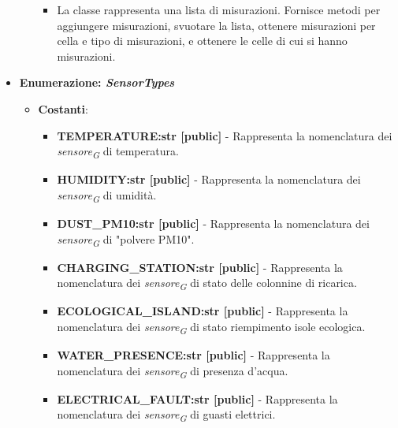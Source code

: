 \begin{itemize}
\begin{itemize}
        \begin{itemize}
            \item La classe rappresenta una lista di misurazioni. Fornisce metodi per aggiungere misurazioni, svuotare la lista, ottenere misurazioni per cella e tipo di misurazioni, e ottenere le celle di cui si hanno misurazioni.
        \end{itemize}
    \end{itemize}
    \item\textbf{Enumerazione: \textit{SensorTypes}}
        \begin{itemize}
            \item \textbf{Costanti}: 
            \begin{itemize}
                \item \textbf{TEMPERATURE:str [public]} - Rappresenta la nomenclatura dei \textit{sensore}\textsubscript{\textit{G}} di temperatura.
                \item \textbf{HUMIDITY:str [public]} - Rappresenta la nomenclatura dei \textit{sensore}\textsubscript{\textit{G}} di umidità.
                \item \textbf{DUST\_PM10:str [public]} - Rappresenta la nomenclatura dei \textit{sensore}\textsubscript{\textit{G}} di "polvere PM10".
                \item \textbf{CHARGING\_STATION:str [public]} - Rappresenta la nomenclatura dei \textit{sensore}\textsubscript{\textit{G}} di stato delle colonnine di ricarica.
                \item \textbf{ECOLOGICAL\_ISLAND:str [public]} - Rappresenta la nomenclatura dei \textit{sensore}\textsubscript{\textit{G}} di stato riempimento isole ecologica.
                \item \textbf{WATER\_PRESENCE:str [public]} - Rappresenta la nomenclatura dei \textit{sensore}\textsubscript{\textit{G}} di presenza d'acqua.
                \item \textbf{ELECTRICAL\_FAULT:str [public]} - Rappresenta la nomenclatura dei \textit{sensore}\textsubscript{\textit{G}} di guasti elettrici.
            \end{itemize}


\end{itemize}
\end{itemize}
